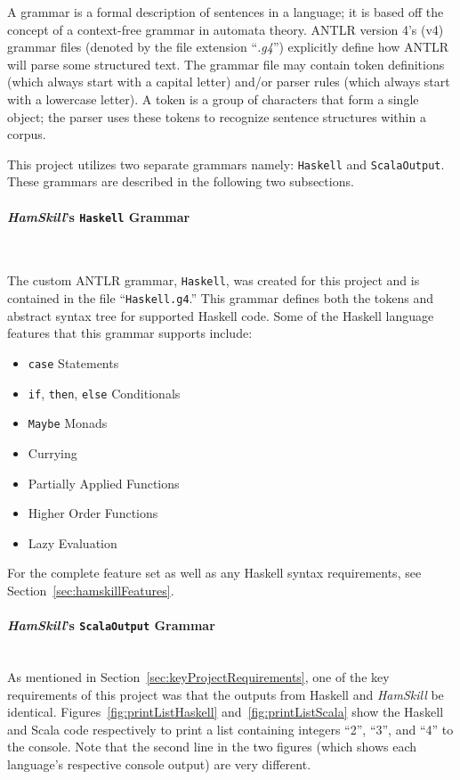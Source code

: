 \documentclass{report}
\newcommand{\myparagraph}[1]{\paragraph{#1}\mbox{}\\}
\begin{document}
A grammar is a formal description of sentences in a language; it is based off the concept of a context-free grammar in automata theory.  ANTLR version 4's (v4) grammar files (denoted by the file extension ``\emph{.g4}'') explicitly define how ANTLR will parse some structured text.  The grammar file may contain token definitions (which always start with a capital letter) and/or parser rules (which always start with a lowercase letter).  A token is a group of characters that form a single object; the parser uses these tokens to recognize sentence structures within a corpus.

This project utilizes two separate grammars namely: \texttt{Haskell} and \texttt{ScalaOutput}.  These grammars are described in the following two subsections.

\myparagraph{\textit{HamSkill}'s \texttt{Haskell} Grammar}\label{sec:haskellG4}

The custom ANTLR grammar, \texttt{Haskell}, was created for this project and is contained in the file ``\texttt{Haskell.g4}.''  This grammar defines both the tokens and abstract syntax tree for supported Haskell code.  Some of the Haskell language features that this grammar supports include:

\begin{itemize}
   \item \texttt{case} Statements
   \item \texttt{if}, \texttt{then}, \texttt{else} Conditionals
   \item \texttt{Maybe} Monads
   \item Currying
   \item Partially Applied Functions
   \item Higher Order Functions
   \item Lazy Evaluation
\end{itemize}

For the complete feature set as well as any Haskell syntax requirements, see Section~\ref{sec:hamskillFeatures}.

\myparagraph{\textit{HamSkill}'s \texttt{ScalaOutput} Grammar} 

As mentioned in Section~\ref{sec:keyProjectRequirements}, one of the key requirements of this project was that the outputs from Haskell and \textit{HamSkill} be identical.  Figures~\ref{fig:printListHaskell} and~\ref{fig:printListScala} show the Haskell and Scala code respectively to print a list containing integers ``2'', ``3'', and ``4'' to the console.  Note that the second line in the two figures (which shows each language's respective console output) are very different.
\end{document}
